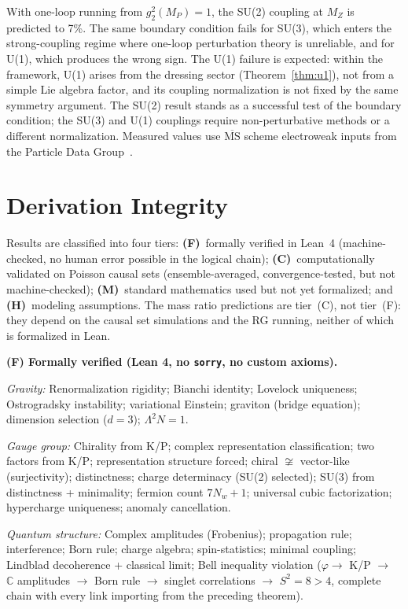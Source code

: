 \documentclass[12pt,a4paper]{article}
\begin{document}
With one-loop running from $g_2^2(M_P) = 1$, the SU(2) coupling at $M_Z$ is predicted to 7\%.  The same boundary condition fails for SU(3), which enters the strong-coupling regime where one-loop perturbation theory is unreliable, and for U(1), which produces the wrong sign.  The U(1) failure is expected: within the framework, U(1) arises from the dressing sector (Theorem~\ref{thm:u1}), not from a simple Lie algebra factor, and its coupling normalization is not fixed by the same symmetry argument.  The SU(2) result stands as a successful test of the boundary condition; the SU(3) and U(1) couplings require non-perturbative methods or a different normalization.  Measured values use $\overline{\mathrm{MS}}$ scheme electroweak inputs from the Particle Data Group~\cite{pdg}.

\section{Derivation Integrity}
\label{sec:integrity}

Results are classified into four tiers: \textbf{(F)}~formally verified in Lean~4 (machine-checked, no human error possible in the logical chain); \textbf{(C)}~computationally validated on Poisson causal sets (ensemble-averaged, convergence-tested, but not machine-checked); \textbf{(M)}~standard mathematics used but not yet formalized; and \textbf{(H)}~modeling assumptions.  The mass ratio predictions are tier~(C), not tier~(F): they depend on the causal set simulations and the RG running, neither of which is formalized in Lean.

\textbf{(F) Formally verified (Lean 4, no \texttt{sorry}, no custom axioms).}

\emph{Gravity:} Renormalization rigidity; Bianchi identity; Lovelock uniqueness; Ostrogradsky instability; variational Einstein; graviton (bridge equation); dimension selection ($d = 3$); $\Lambda^2 N = 1$.

\emph{Gauge group:} Chirality from K/P; complex representation classification; two factors from K/P; representation structure forced; chiral $\not\cong$ vector-like (surjectivity); distinctness; charge determinacy (SU(2) selected); SU(3) from distinctness + minimality; fermion count $7N_w+1$; universal cubic factorization; hypercharge uniqueness; anomaly cancellation.

\emph{Quantum structure:} Complex amplitudes (Frobenius); propagation rule; interference; Born rule; charge algebra; spin-statistics; minimal coupling; Lindblad decoherence + classical limit; Bell inequality violation ($\varphi \to$ K/P $\to$ $\mathbb{C}$ amplitudes $\to$ Born rule $\to$ singlet correlations $\to$ $S^2 = 8 > 4$, complete chain with every link importing from the preceding theorem).
\end{document}

